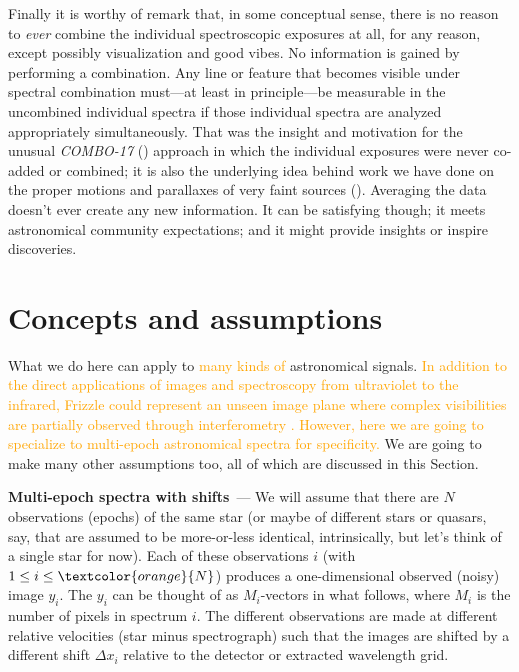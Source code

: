 \documentclass[modern, linenumbers]{aastex631}
\renewcommand{\paragraph}[1]{\medskip\par\noindent\textbf{#1}~---}
\newcommand{\sectionname}{Section}
\newcommand{\modified}[1]{\textcolor{orange}{#1}}
\begin{document}
Finally it is worthy of remark that, in some conceptual sense, there is no reason to \emph{ever} combine the individual spectroscopic exposures at all, for any reason, except possibly visualization and good vibes.
No information is gained by performing a combination.
Any line or feature that becomes visible under spectral combination must---at least in principle---be measurable in the uncombined individual spectra if those individual spectra are analyzed appropriately simultaneously.
That was the insight and motivation for the unusual \textsl{COMBO-17} (\citealt{combo17}) approach in which the individual exposures were never co-added or combined; it is also the underlying idea behind work we have done on the proper motions and parallaxes of very faint sources (\citealt{undetectable}).
Averaging the data doesn't ever create any new information.
It can be satisfying though; it meets astronomical community expectations; and it might provide insights or inspire discoveries.

\section{Concepts and assumptions}\label{sec:assumptions}

What we do here can apply to \modified{many kinds of} astronomical signals. \modified{In addition to the direct applications of images and spectroscopy from ultraviolet to the infrared, Frizzle could represent an unseen image plane where complex visibilities are partially observed through interferometry \citep[e.g.,][]{Hilder:2025}. However, here we are going to specialize to multi-epoch astronomical spectra for specificity.}
We are going to make many other assumptions too, all of which are discussed in this \sectionname.

\paragraph{Multi-epoch spectra with shifts}
We will assume that there are $N$ observations (epochs) of the same star (or maybe of different stars or quasars, say, that are assumed to be more-or-less identical, intrinsically, but let's think of a single star for now).
Each of these observations $i$ (with $1\leq i\leq \modified{N}$) produces a one-dimensional observed (noisy) image $y_i$.
The $y_i$ can be thought of as $M_i$-vectors in what follows, where $M_i$ is the number of pixels in spectrum $i$.
The different observations are made at different relative velocities (star minus spectrograph) such that the images are shifted by a different shift $\Delta x_i$ relative to the detector or extracted wavelength grid.
\end{document}
